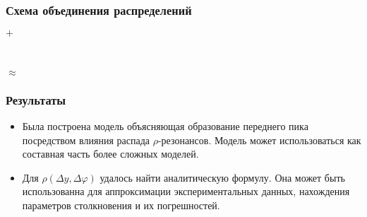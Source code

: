 \documentclass{beamer}
\renewcommand{\phi}{\varphi}
\def\Dphi{\Delta\phi}
\def\Dy{\Delta y}
\begin{document}
\begin{frame}[fragile]
    \frametitle{Схема объединения распределений}  
	\begin{minipage}[h]{0.45\linewidth}
		\begin{figure}
		\end{figure}
	\end{minipage}
	{\Large $+$}
	\begin{minipage}[h]{0.4\linewidth}
		\begin{figure}
		\end{figure}
	\end{minipage}
	\\
	\begin{center}
	{\Large$\approx$}
	\begin{minipage}[h]{0.4\linewidth}
		\begin{figure}
		\end{figure}
	\end{minipage}
	\end{center}
\end{frame}


\begin{frame}[fragile]
    \frametitle{Результаты}
	\begin{itemize}
		\item Была построена модель объясняющая образование переднего пика посредством влияния распада $\rho$-резонансов. Модель может использоваться как составная часть более сложных моделей.
		\item Для  $\rho (\Dy, \Dphi)$ удалось найти аналитическую формулу. Она может быть использованна для аппроксимации экспериментальных данных, нахождения параметров столкновения и их погрешностей.
	\end{itemize}
\end{frame}
\end{document}
